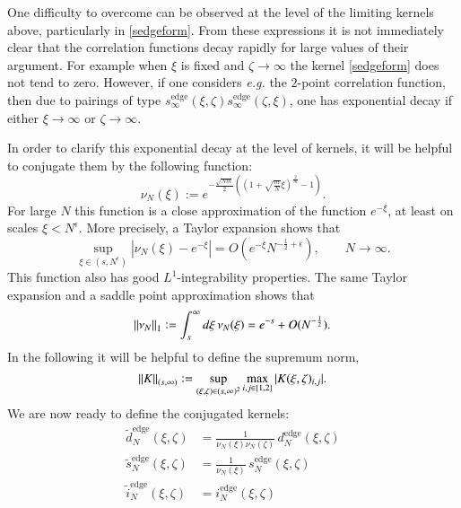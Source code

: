 \documentclass[11pt,reqno]{amsproc}
\numberwithin{equation}{section}
\numberwithin{theorem}{section}
\begin{document}
One difficulty to overcome can be observed at the level of the limiting kernels above, particularly in \eqref{sedgeform}. From these expressions it is not immediately clear that the correlation functions decay rapidly for large values of their argument. For example when $\xi$ is fixed and $\zeta \to \infty$ the kernel \eqref{sedgeform} does not tend to zero. However, if one considers \textit{e.g.} the $2$-point correlation function, then due to pairings of type $s_{\infty}^{\mathrm{edge}}(\xi,\zeta)s_{\infty}^{\mathrm{edge}}(\zeta,\xi)$, one has exponential decay if either $\xi \to \infty$ or $\zeta \to \infty$.

In order to clarify this exponential decay at the level of kernels, it will be helpful to conjugate them by the following function:
\begin{equation}
\nu_{N}(\xi) := e^{-\frac{\sqrt{Nm}}{2}\left(\left(1+\sqrt{\frac{m}{N}}\xi\right)^{\frac{2}{m}}-1\right)}. \label{nudef}
\end{equation}
For large $N$ this function is a close approximation of the function $e^{-\xi}$, at least on scales $\xi < N^{\epsilon}$. More precisely, a Taylor expansion shows that
\begin{equation}
\sup_{\xi \in (s,N^{\epsilon})}|\nu_{N}(\xi)-e^{-\xi}| = O(e^{-\xi}N^{-\frac{1}{2}+\epsilon}), \qquad N \to \infty.
\end{equation}
This function also has good $L^{1}$-integrability properties. The same Taylor expansion and a saddle point approximation shows that
\begin{equation}
\norm{\nu_{N}}_{1} := \int_{s}^{\infty}d\xi\,\nu_{N}(\xi) = e^{-s}+O(N^{-\frac{1}{2}}). \label{finitenu}
\end{equation}
In the following it will be helpful to define the supremum norm,
\begin{equation}
\norm{K}_{(s,\infty)} := \sup_{(\xi,\zeta) \in (s,\infty)^{2}}\max_{i,j\in\{1,2\}}|K(\xi,\zeta)_{i,j}|.
\end{equation}
We are now ready to define the conjugated kernels:
\begin{equation}
\begin{split}
\tilde{d}_{N}^{\mathrm{edge}}(\xi,\zeta) &= \frac{1}{\nu_{N}(\xi)\nu_{N}(\zeta)}\,d^{\mathrm{edge}}_{N}(\xi,\zeta)\\
\tilde{s}_{N}^{\mathrm{edge}}(\xi,\zeta) &= \frac{1}{\nu_{N}(\xi)}\,s^{\mathrm{edge}}_{N}(\xi,\zeta)\\
\tilde{i}^{\mathrm{edge}}_{N}(\xi,\zeta) &= i_{N}^{\mathrm{edge}}(\xi,\zeta)
\end{split}
\end{equation}
\end{document}
